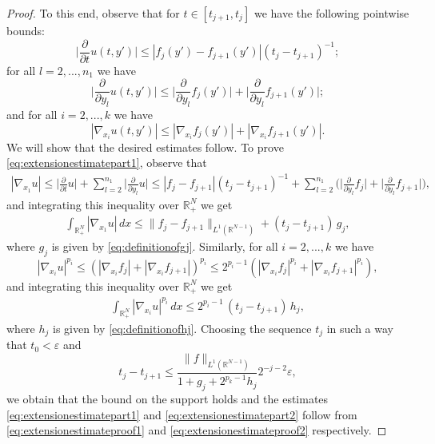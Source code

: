 \documentclass[reqno,12pt]{amsart}
\def\R{\mathbb R}
\numberwithin{equation}{section}
\begin{document}
\begin{proof}
To this end, observe that for $t \in [t_{j+1}, t_j]$ we have the following pointwise bounds:
\begin{equation}
\bigg|\frac{\partial}{\partial t} u(t,y') \bigg| \leq |f_j(y') - f_{j+1}(y')| (t_j - t_{j+1})^{-1};
\end{equation}
for all $l = 2, ..., n_1$ we have
\begin{equation}
\bigg|\frac{\partial}{\partial y_l} u(t,y') \bigg| \leq \bigg|\frac{\partial}{\partial y_l} f_j(y') \bigg| + \bigg|\frac{\partial}{\partial y_l} f_{j+1}(y') \bigg|;
\end{equation}
and for all $i = 2, ..., k$ we have
\begin{equation}
| \nabla_{x_i} u(t,y') | \leq | \nabla_{x_i} f_j(y') | + | \nabla_{x_i} f_{j+1}(y') |.
\end{equation}
We will show that the desired estimates follow. To prove \eqref{eq:extensionestimatepart1}, observe that
\begin{align}
|\nabla_{x_1} u| \leq \bigg|\frac{\partial}{\partial t} u \bigg| + \sum_{l = 2}^{n_1} \bigg|\frac{\partial}{\partial y_l} u \bigg| \leq |f_j - f_{j+1}| (t_j - t_{j+1})^{-1} + \sum_{l = 2}^{n_1} \bigg( \bigg|\frac{\partial}{\partial y_l} f_j \bigg| + \bigg|\frac{\partial}{\partial y_l} f_{j+1} \bigg| \bigg),
\end{align}
and integrating this inequality over $\R^N_+$ we get
\begin{align}\label{eq:extensionestimateproof1}
\int_{\R^N_+} |\nabla_{x_1} u| \, dx \leq \|f_j - f_{j+1} \|_{L^1(\R^{N-1})} + (t_j - t_{j+1}) \, g_j,
\end{align}
where $g_j$ is given by \eqref{eq:definitionofgj}. Similarly, for all $i = 2, ..., k$ we have
\begin{equation}
|\nabla_{x_i} u|^{p_i} \leq (| \nabla_{x_i} f_j | + | \nabla_{x_i} f_{j+1} |)^{p_i} \leq 2^{p_i - 1} (| \nabla_{x_i} f_j|^{p_i} + | \nabla_{x_i} f_{j+1} |^{p_i}),
\end{equation}
and integrating this inequality over $\R^N_+$ we get
\begin{align}\label{eq:extensionestimateproof2}
\int_{\R^N_+} |\nabla_{x_i} u|^{p_i} \, dx \leq 2^{p_i - 1} \, (t_j - t_{j+1}) \, h_j,
\end{align}
where $h_j$ is given by \eqref{eq:definitionofhj}. Choosing the sequence $t_j$ in such a way that $t_0 < \varepsilon$ and
\begin{equation}
t_j - t_{j+1} \leq \frac{\| f \|_{L^1(\R^{N-1})}}{1 + g_j + 2^{p_k - 1} h_j} 2^{-j-2} \varepsilon,
\end{equation}
we obtain that the bound on the support holds and the estimates \eqref{eq:extensionestimatepart1} and \eqref{eq:extensionestimatepart2} follow from \eqref{eq:extensionestimateproof1} and \eqref{eq:extensionestimateproof2} respectively.
\end{proof}
\end{document}
